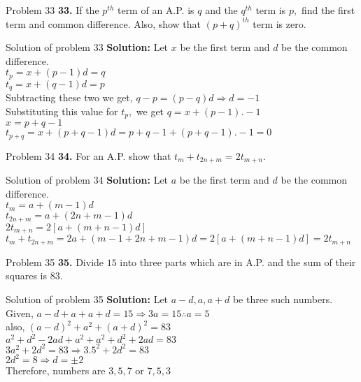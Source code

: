 \documentclass[aspectratio=1610,8pt]{beamer}
\begin{document}
\begin{frame}{Problem 33}
  \textbf{33.} If the $p^{th}$ term of an A.P. is $q$ and the $q^{th}$ term is
  $p,$ find the first term and common difference. Also, show that $(p +
  q)^{th}$ term is zero.
\end{frame}
\begin{frame}{Solution of problem 33}
  \textbf{Solution:} Let $x$ be the first term and $d$ be the common
  difference.\\
  $t_p = x + (p - 1)d = q$\\
  $t_q = x + (q - 1)d = p$\\
  Subtracting these two we get, $q - p = (p - q)d \Rightarrow d = -1$\\
  Substituting this value for $t_p,$ we get $q = x + (p - 1). -1$\\
  $x = p + q - 1$\\
  $t_{p + q} = x + (p + q - 1)d = p + q -1 + (p + q - 1). -1 = 0$
\end{frame}
\begin{frame}{Problem 34}
  \textbf{34.} For an A.P. show that $t_m + t_{2n + m} = 2t_{m + n}.$
\end{frame}
\begin{frame}{Solution of problem 34}
  \textbf{Solution:} Let $a$ be the first term and $d$ be the common
  difference.\\
  $t_m = a + (m - 1)d$\\
  $t_{2n + m} = a + (2n + m - 1)d$\\
  $2t_{m+n} = 2[a + (m + n - 1)d]$\\
  $t_m + t_{2n + m} = 2a + (m - 1 + 2n + m - 1)d = 2[a + (m + n - 1)d] = 2t_{m
    + n}$
\end{frame}
\begin{frame}{Problem 35}
  \textbf{35.} Divide $15$ into three parts which are in A.P. and the sum of
  their squares is $83.$
\end{frame}
\begin{frame}{Solution of problem 35}
  \textbf{Solution:} Let $a - d, a , a + d$ be three such numbers.\\
  Given, $a - d + a + a + d = 15 \Rightarrow 3a = 15 \therefore a = 5$\\
  also, $(a - d)^2 + a^2 + (a + d)^2 = 83$\\
  $a^2 + d^2 - 2ad + a^2 + a^2 + d^2 + 2ad = 83$\\
  $3a^2 + 2d^2 = 83 \Rightarrow 3.5^2 + 2d^2 = 83$\\
  $2d^2 = 8 \Rightarrow d = \pm 2$\\
  Therefore, numbers are $3, 5, 7$ or $7, 5, 3$
\end{frame}
\end{document}
